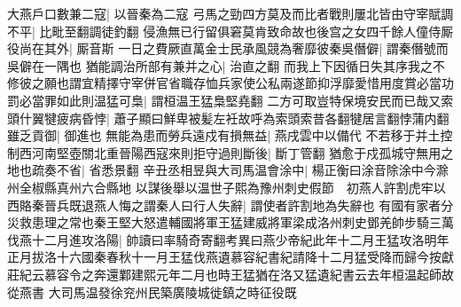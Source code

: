 大燕戶口數兼二寇|{
	以晉秦為二寇}
弓馬之勁四方莫及而比者戰則屢北皆由守宰賦調不平|{
	比毗至翻調徒釣翻}
侵漁無已行留俱窘莫肯致命故也後宫之女四千餘人僮侍厮役尚在其外|{
	厮音斯}
一日之費厥直萬金士民承風競為奢靡彼秦吳僭僻|{
	謂秦僭號而吳僻在一隅也}
猶能調治所部有兼并之心|{
	治直之翻}
而我上下因循日失其序我之不修彼之願也謂宜精擇守宰併官省職存恤兵家使公私兩遂節抑浮靡愛惜用度賞必當功罰必當罪如此則温猛可梟|{
	謂桓温王猛梟堅堯翻}
二方可取豈特保境安民而已哉又索頭什翼犍疲病昏悖|{
	蕭子顯曰鮮卑被髪左衽故呼為索頭索昔各翻犍居言翻悖蒲内翻}
雖乏貢御|{
	御進也}
無能為患而勞兵遠戍有損無益|{
	燕戌雲中以備代}
不若移于并土控制西河南堅壺關北重晉陽西寇來則拒守過則斷後|{
	斷丁管翻}
猶愈于戍孤城守無用之地也疏奏不省|{
	省悉景翻}
辛丑丞相昱與大司馬温會涂中|{
	楊正衡曰涂音除涂中今滁州全椒縣真州六合縣地}
以謀後舉以温世子熙為豫州刺史假節　初燕人許割虎牢以西賂秦晉兵既退燕人悔之謂秦人曰行人失辭|{
	謂使者許割地為失辭也}
有國有家者分災救患理之常也秦王堅大怒遣輔國將軍王猛建威將軍梁成洛州刺史鄧羌帥步騎三萬伐燕十二月進攻洛陽|{
	帥讀曰率騎奇寄翻考異曰燕少帝紀此年十二月王猛攻洛明年正月拔洛十六國秦春秋十一月王猛伐燕遺慕容紀書紀請降十二月猛受降而歸今按獻莊紀云慕容令之奔還鄴建熙元年二月也時王猛猶在洛又猛遺紀書云去年桓温起師故從燕書}
大司馬温發徐兖州民築廣陵城徙鎮之時征役既


